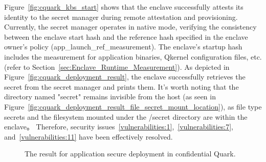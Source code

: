 Figure~\ref{fig:cquark_kbs_start} shows that the enclave successfully attests its identity to the secret manager during remote attestation and provisioning. Currently, the secret manager operates in native mode, verifying the consistency between the enclave start hash and the reference hash specified in the 
enclave owner's policy (app\_launch\_ref\_measurement). The enclave's startup hash includes the measurement for application binaries, Qkernel configuration files, etc. (refer to Section~\ref{sec:Enclave_Runtime_Measurement}). As depicted in Figure~\ref{fig:cquark_deployment_result}, the enclave successfully retrieves the secret from the secret manager and prints them. It's worth 
noting that the directory named "secret" remains invisible from the host (as seen in Figure~\ref{fig:cquark_deployment_result_file_secret_mount_location}), as file type secrets and the filesystem mounted under the /secret directory are within the enclave。 Therefore, security issues~\ref{vulnerabilities:1},~\ref{vulnerabilities:7}, and~\ref{vulnerabilities:11} 
have been effectively resolved.


\begin{figure}[!htb]

    
    
    \caption[The result for application secure deployment in confidential Quark]{The result for application secure deployment in confidential Quark.\label{fig:cquark_deployment}}
\end{figure}





